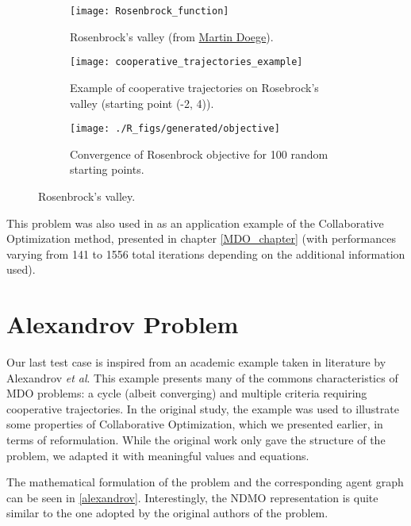 \begin{figure}
\centering
	\begin{subfigure}{0.45\textwidth}
		\texttt{[image: Rosenbrock\_function]}
		\caption{Rosenbrock's valley (from \href{http://commons.wikimedia.org/wiki/File:Rosenbrock_function.svg}{Martin Doege}).}\label{rosenbrock_plot}
	\end{subfigure}
	\hfill%
	\begin{subfigure}{0.45\textwidth}	
		\centering
		\texttt{[image: cooperative\_trajectories\_example]}
		\caption{Example of cooperative trajectories on Rosebrock's valley (starting point (-2, 4)).}\label{collective_traj_rosenbrock_plot}
	\end{subfigure}
	
	\begin{subfigure}{0.4\textwidth}
		\centering
		\texttt{[image: ./R\_figs/generated/objective]}	
		\caption{Convergence of Rosenbrock objective for 100 random starting points.}\label{rosenbrock_res}
	\end{subfigure}
\caption{Rosenbrock's valley.}
\end{figure}

This problem was also used in \cite{Ilan:1994:MOM:887207} as an application example of the Collaborative Optimization method, presented in chapter \ref{MDO_chapter} (with performances varying from 141 to 1556 total iterations depending on the additional information used).

\section{Alexandrov Problem}

Our last test case is inspired from an academic example taken in literature by Alexandrov \emph{et al}\cite{alexandrov2002analytical}. This example presents many of the commons characteristics of MDO problems: a cycle (albeit converging) and multiple criteria requiring cooperative trajectories. In the original study, the example was used to illustrate some properties of Collaborative Optimization, which we presented earlier, in terms of reformulation. While the original work only gave the structure of the problem, we adapted it with meaningful values and equations.

The mathematical formulation of the problem and the corresponding agent graph can be seen in \figurename{} \ref{alexandrov}. Interestingly, the NDMO representation is quite similar to the one adopted by the original authors of the problem.

